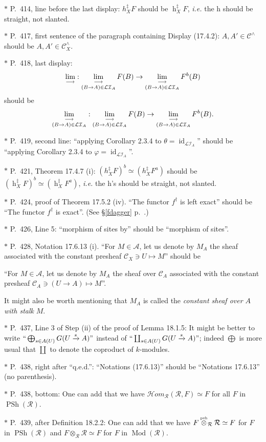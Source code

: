 \documentclass[12pt]{article}%
\theoremstyle{remark}
\theoremstyle{definition}
\newcommand{\nn}{\noindent}
\newcommand{\cc}{\mathcal}
\newcommand{\oo}{\operatorname}
\newcommand{\A}{\mathcal A}
\newcommand{\C}{\mathcal C}
\newcommand{\pp}{\varphi}
\newcommand{\HOM}{\cc H\!\mathit{om}}
\newcommand{\xr}{\xrightarrow}
\newcommand{\ilim}{\operatornamewithlimits{\underset{\longrightarrow}{lim}}}
\DeclareMathOperator{\id}{id}
\DeclareMathOperator{\Mod}{Mod}
\begin{document}
\nn$*$ P.~414, line before the last display: $h_X^\ddagger F$ should be $\oo h_X^\ddagger F$, \emph{i.e.} the h should be straight, not slanted. 

\nn$*$ P.~417, first sentence of the paragraph containing Display (17.4.2): $A,A'\in\C^\wedge$ should be $A,A'\in\C_X^\wedge$. 

\nn$*$ P.~418, last display: 
$$
\ilim:\ilim_{(B\to A)\in\cc{LI}_A}F(B)\to\ilim_{(B\to A)\in\cc{LI}_A}F^b(B)
$$ 
should be 
$$
\ilim_{(B\to A)\in\cc{LI}_A}:\ilim_{(B\to A)\in\cc{LI}_A}F(B)\to\ilim_{(B\to A)\in\cc{LI}_A}F^b(B).
$$

\nn$*$ P.~419, second line: ``applying Corollary 2.3.4 to $\theta=\id_{\cc{LI}_A}$'' should be ``applying Corollary 2.3.4 to $\pp=\id_{\cc{LI}_A}$''.

\nn$*$ P.~421, Theorem 17.4.7 (i): $(h_X^\ddagger F)^b\simeq(h_X^\ddagger F^a)$ should be $(\oo h_X^\ddagger F)^b\simeq(\oo h_X^\ddagger F^a)$, \emph{i.e.} the h's should be straight, not slanted.

\nn$*$ P.~424, proof of Theorem 17.5.2 (iv). ``The functor $f^\dagger$ is left exact'' should be ``The functor $f^\dagger$ is exact''. (See \S\ref{fdagger} p.~\pageref{fdagger}.) 

\nn$*$ P.~426, Line 5: ``morphism of sites by'' should be ``morphism of sites''.

\nn$*$ P.~428, Notation 17.6.13 (i). ``For $M\in\A$, let us denote by $M_A$ the sheaf associated with the constant presheaf $\C_X\ni U\mapsto M$'' should be  

``For $M\in\A$, let us denote by $M_A$ the sheaf over $\C_A$ associated with the constant presheaf $\C_A\ni(U\to A)\mapsto M$''. 

It might also be worth mentioning that $M_A$ is called the \emph{constant sheaf over $A$ with stalk} $M$. 

\nn$*$ P.~437, Line 3 of Step (ii) of the proof of Lemma 18.1.5: It might be better to write $``\bigoplus_{s\in A(U)}G(U\xr sA)"$ instead of $``\coprod_{s\in A(U)}G(U\xr sA)"$; indeed $\bigoplus$ is more usual that $\coprod$ to denote the coproduct of $k$-modules. 

\nn$*$ P.~438, right after ``q.e.d.'': ``Notations (17.6.13)'' should be ``Notations 17.6.13'' (no parenthesis). 

\nn$*$ P.~438, bottom: One can add that we have $\HOM_{\cc R}(\cc R,F)\simeq F$ for all $F$ in $\oo{PSh}(\cc R)$. 

\nn$*$ P.~439, after Definition 18.2.2: One can add that we have $F\overset{\text{\tiny psh}}{\otimes}_{\cc R}\cc R\simeq F$ for $F$ in $\oo{PSh}(\cc R)$ and $F\otimes_{\cc R}\cc R\simeq F$ for $F$ in $\Mod(\cc R)$. 
\end{document}
